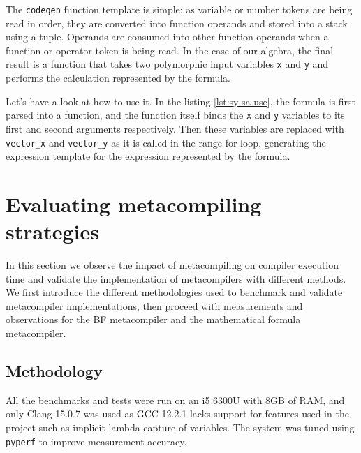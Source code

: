 \documentclass[../../main.tex]{subfiles}
\begin{document}
The \lstinline|codegen| function template is simple: as variable or number tokens
are being read in order, they are converted into function operands and stored
into a stack using a tuple. Operands are consumed into other function operands
when a function or operator token is being read. In the case of our algebra,
the final result is a function that takes two polymorphic input variables
\lstinline|x| and \lstinline|y| and performs the calculation represented by the
formula.



Let's have a look at how to use it.
In the listing \ref{lst:sy-sa-use}, the formula is first parsed into a function,
and the function itself binds the \lstinline|x| and \lstinline|y| variables to
its first and second arguments respectively. Then these variables are replaced
with \lstinline|vector_x| and \lstinline|vector_y| as it is called in the range
for loop, generating the expression template for the expression represented by
the formula.



\section{Evaluating metacompiling strategies}

In this section we observe the impact of metacompiling on compiler execution
time and validate the implementation of metacompilers with different methods.
We first introduce the different methodologies used to benchmark and validate
metacompiler implementations, then proceed with measurements and observations
for the BF metacompiler and the mathematical formula metacompiler.

\subsection{Methodology}

All the benchmarks and tests were run on an i5 6300U with 8GB of RAM, and only
Clang 15.0.7 was used as GCC 12.2.1 lacks support for features used in the
project such as implicit lambda capture of \constexpr variables. The system was
tuned using \lstinline|pyperf| to improve measurement accuracy.\\
\end{document}
